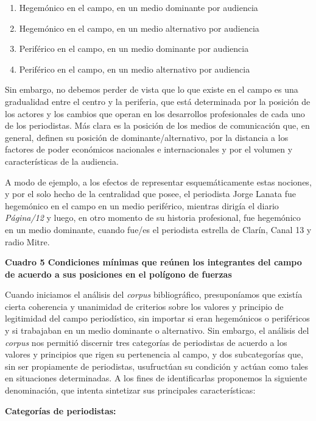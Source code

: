 \begin{enumerate}
\def\labelenumi{\arabic{enumi})}
\item
  Hegemónico en el campo, en un medio dominante por audiencia
\item
  Hegemónico en el campo, en un medio alternativo por audiencia
\item
  Periférico en el campo, en un medio dominante por audiencia
\item
  Periférico en el campo, en un medio alternativo por audiencia
\end{enumerate}

Sin embargo, no debemos perder de vista que lo que existe en el campo es una gradualidad entre el centro y la periferia, que está determinada por la posición de los actores y los cambios que operan en los desarrollos profesionales de cada uno de los periodistas. Más clara es la posición de los medios de comunicación que, en general, definen su posición de dominante/alternativo, por la distancia a los factores de poder económicos nacionales e internacionales y por el volumen y características de la audiencia.

A modo de ejemplo, a los efectos de representar esquemáticamente estas nociones, y por el solo hecho de la centralidad que posee, el periodista Jorge Lanata fue hegemónico en el campo en un medio periférico, mientras dirigía el diario \emph{Página/12} y luego, en otro momento de su historia profesional, fue hegemónico en un medio dominante, cuando fue/es el periodista estrella de Clarín, Canal 13 y radio Mitre.

\textbf{Cuadro 5 Condiciones mínimas que reúnen los integrantes del campo de acuerdo a sus posiciones en el polígono de fuerzas}


Cuando iniciamos el análisis del \emph{corpus} bibliográfico, presuponíamos que existía cierta coherencia y unanimidad de criterios sobre los valores y principio de legitimidad del campo periodístico, sin importar si eran hegemónicos o periféricos y si trabajaban en un medio dominante o alternativo. Sin embargo, el análisis del \emph{corpus} nos permitió discernir tres categorías de periodistas de acuerdo a los valores y principios que rigen su pertenencia al campo, y dos subcategorías que, sin ser propiamente de periodistas, usufructúan su condición y actúan como tales en situaciones determinadas. A los fines de identificarlas proponemos la siguiente denominación, que intenta sintetizar sus principales características:

\textbf{Categorías de periodistas:}

